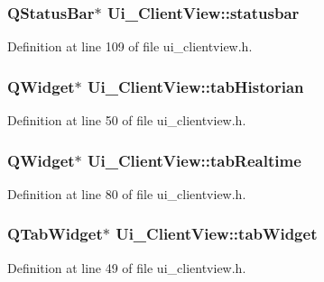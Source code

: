 \subsubsection[{statusbar}]{\setlength{\rightskip}{0pt plus 5cm}Q\+Status\+Bar$\ast$ Ui\+\_\+\+Client\+View\+::statusbar}\label{class_ui___client_view_a5ccc50aea2bedaeb0abfaed52336fdd4}


Definition at line 109 of file ui\+\_\+clientview.\+h.

\hypertarget{class_ui___client_view_a95f5e40e8c3d2e38e9acc567ef2fc80d}{}
\subsubsection[{tab\+Historian}]{\setlength{\rightskip}{0pt plus 5cm}Q\+Widget$\ast$ Ui\+\_\+\+Client\+View\+::tab\+Historian}\label{class_ui___client_view_a95f5e40e8c3d2e38e9acc567ef2fc80d}


Definition at line 50 of file ui\+\_\+clientview.\+h.

\hypertarget{class_ui___client_view_ab7a905c8d7da66d465f7801c6724a591}{}
\subsubsection[{tab\+Realtime}]{\setlength{\rightskip}{0pt plus 5cm}Q\+Widget$\ast$ Ui\+\_\+\+Client\+View\+::tab\+Realtime}\label{class_ui___client_view_ab7a905c8d7da66d465f7801c6724a591}


Definition at line 80 of file ui\+\_\+clientview.\+h.

\hypertarget{class_ui___client_view_a8ae60be0d2116e4b4256930f6bae8762}{}
\subsubsection[{tab\+Widget}]{\setlength{\rightskip}{0pt plus 5cm}Q\+Tab\+Widget$\ast$ Ui\+\_\+\+Client\+View\+::tab\+Widget}\label{class_ui___client_view_a8ae60be0d2116e4b4256930f6bae8762}


Definition at line 49 of file ui\+\_\+clientview.\+h.

